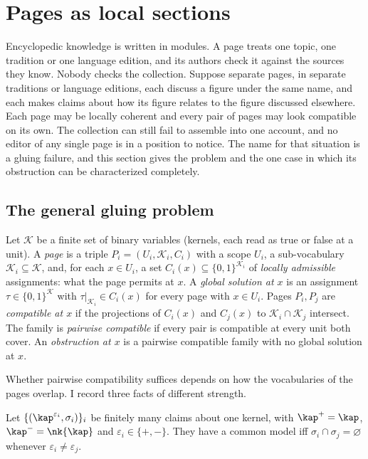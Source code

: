 \section{Pages as local sections}\label{sec:gluing}

Encyclopedic knowledge is written in modules. A page treats one topic, one tradition or one language edition, and its authors check it against the sources they know. Nobody checks the collection. Suppose separate pages, in separate traditions or language editions, each discuss a figure under the same name, and each makes claims about how its figure relates to the figure discussed elsewhere. Each page may be locally coherent and every pair of pages may look compatible on its own. The collection can still fail to assemble into one account, and no editor of any single page is in a position to notice. The name for that situation is a gluing failure, and this section gives the problem and the one case in which its obstruction can be characterized completely.

\subsection{The general gluing problem}

\begin{definition}\label{def:gluing}
Let $\mathcal K$ be a finite set of binary variables (kernels, each read as true or false at a unit). A \emph{page} is a triple $P_i=(U_i,\mathcal K_i,C_i)$ with a scope $U_i$, a sub-vocabulary $\mathcal K_i\subseteq\mathcal K$, and, for each $x\in U_i$, a set $C_i(x)\subseteq\{0,1\}^{\mathcal K_i}$ of \emph{locally admissible} assignments: what the page permits at $x$. A \emph{global solution at $x$} is an assignment $\tau\in\{0,1\}^{\mathcal K}$ with $\tau|_{\mathcal K_i}\in C_i(x)$ for every page with $x\in U_i$. Pages $P_i,P_j$ are \emph{compatible at $x$} if the projections of $C_i(x)$ and $C_j(x)$ to $\mathcal K_i\cap\mathcal K_j$ intersect. The family is \emph{pairwise compatible} if every pair is compatible at every unit both cover. An \emph{obstruction at $x$} is a pairwise compatible family with no global solution at $x$.
\end{definition}

Whether pairwise compatibility suffices depends on how the vocabularies of the pages overlap. I record three facts of different strength.

\begin{proposition}\label{prop:single}
Let $\{(\kap^{\varepsilon_i},\sigma_i)\}_i$ be finitely many claims about one kernel, with $\kap^{+}=\kap$, $\kap^{-}=\nk{\kap}$ and $\varepsilon_i\in\{+,-\}$. They have a common model iff $\sigma_i\cap\sigma_j=\varnothing$ whenever $\varepsilon_i\ne\varepsilon_j$.
\end{proposition}

